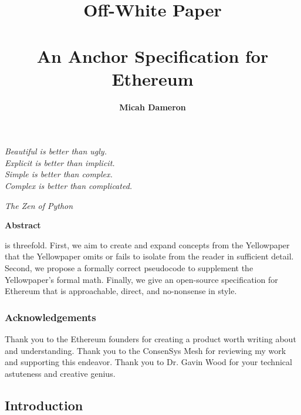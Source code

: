 \documentclass[11pt,a4paper,leqno,bibliography=totoc]{scrartcl}
\author{\textbf{Micah Dameron}}
\title{\Huge{Off-White Paper} \\ \hfill \\ \Large{An Anchor Specification for Ethereum}}
\makeatletter
\let\mcnewpage=\newpage
\newcommand{\TrickSupertabularIntoMulticols}{%
\renewcommand\newpage{%
	      \if@firstcolumn
	            \hrule width\linewidth height0pt
          \columnbreak
      \else
        \mcnewpage
       \fi
  }%
 }
\newenvironment{alphafootnotes}
{\par\edef\savedfootnotenumber{\number\value{footnote}}
\renewcommand{\thefootnote}{\alph{footnote}}
\setcounter{footnote}{0}}
{\par\setcounter{footnote}{\savedfootnotenumber}}
\makeatother
\begin{document}

	\begin{alphafootnotes}

	\pagecolor{blanchedalmond}

	\maketitle



	\epigraph{\textsl{Beautiful is better than ugly. \\
	Explicit is better than implicit. \\
	Simple is better than complex. \\
	Complex is better than complicated.
	}}{\textit{The Zen of Python}}




\hfill \hfill
\begin{center}\textbf{Abstract}\end{center}\par
	 is threefold. First, we aim to create and expand concepts from the Yellowpaper that the Yellowpaper omits or fails to isolate from the reader in sufficient detail. Second, we propose a formally correct pseudocode to supplement the Yellowpaper's formal math. Finally, we give an open-source specification for Ethereum that is approachable, direct, and no-nonsense in style.

\clearpage

\begin{center}\section*{Acknowledgements}\end{center}

 Thank you to the Ethereum founders for creating a product worth writing about and understanding. Thank you to the ConsenSys Mesh for reviewing my work and supporting this endeavor.  Thank you to Dr. Gavin Wood for your technical astuteness and creative genius. 

\clearpage
\tableofcontents
\clearpage


\begin{multicols*}{2}
\TrickSupertabularIntoMulticols
\justify
\columnbreak

	\part{Introduction}


\end{multicols*}
\end{alphafootnotes}
\end{document}

